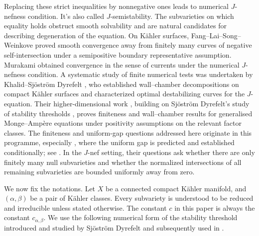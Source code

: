 \documentclass[reqno]{amsart}
\theoremstyle{remark}
\newcommand{\cab}{c_{\alpha,\beta}}
\theoremstyle{plain}
\begin{document}
Replacing these strict inequalities by nonnegative ones leads to numerical \(J\)-nefness condition. It's also called \(J\)-semistability. The subvarieties on which equality holds obstruct smooth solvability and are natural candidates for describing degeneration of the equation. On K\"ahler surfaces, Fang--Lai--Song--Weinkove \cite{FLSW} proved smooth convergence away from finitely many curves of negative self-intersection under a semipositive boundary representative assumption. Murakami \cite{M26a,M26b}  obtained convergence in the sense of currents under the numerical \(J\)-nefness condition. A systematic study of finite numerical tests was undertaken by Khalid--Sj\"ostr\"om Dyrefelt \cite[Theorems 1.10 and 5.3; Proposition 5.8]{KSD24}, who established wall--chamber decompositions on compact K\"ahler surfaces and characterized optimal destabilizing curves for the \(J\)-equation. Their higher-dimensional work \cite[Theorems 1.1, 1.5 and 1.11]{KSD26}, building on Sj\"ostr\"om Dyrefelt's study of stability thresholds \cite[equation (3) and Theorem 5]{SD20}, proves finiteness and wall--chamber results for generalised Monge--Amp\`ere equations under positivity assumptions on the relevant factor classes. The finiteness and uniform-gap questions addressed here originate in this programme, especially \cite[Section 1.2, ; Remark 1.8]{KSD26}, where the uniform gap is predicted and established conditionally; see \cite[Remark 1.8 and Theorem 3.10]{KSD26}. In the \(J\)-nef setting, their questions ask whether there are only finitely many null subvarieties and whether the normalized intersections of all remaining subvarieties are bounded uniformly away from zero. 



We now fix the notations. Let  \(X\) be a connected compact K\"ahler manifold,  and $(\alpha,\beta)$ be a pair of K\"ahler classes. Every subvariety is understood to be reduced and irreducible unless stated otherwise. The constant \(c\) in this paper is always the constant $\cab$. We use the following numerical form of the stability threshold introduced and studied by Sjöström
Dyrefelt \cite{SD20} and subsequently used in \cite{KSD24,KSD26,SSD26}.
\end{document}
